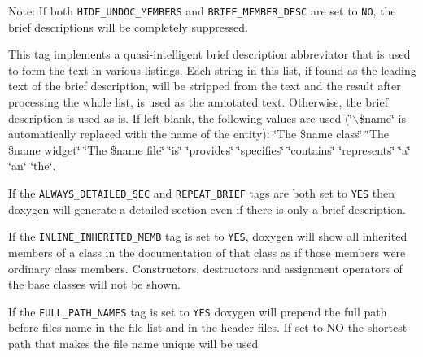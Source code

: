 \begin{description}
\begin{Desc}
\item[Note: ]If both {\tt HIDE\_\-UNDOC\_\-MEMBERS} and {\tt BRIEF\_\-MEMBER\_\-DESC} are set to {\tt NO}, the brief descriptions will be completely suppressed.\end{Desc}
\label{config_cfg_abbreviate_brief}
\hypertarget{config_cfg_abbreviate_brief}{}
 \item[{\tt ABBREVIATE\_\-BRIEF} ] This tag implements a quasi-intelligent brief description abbreviator that is used to form the text in various listings. Each string in this list, if found as the leading text of the brief description, will be stripped from the text and the result after processing the whole list, is used as the annotated text. Otherwise, the brief description is used as-is. If left blank, the following values are used (\char`\"{}$\backslash$\$name\char`\"{} is automatically replaced with the name of the entity): \char`\"{}The \$name class\char`\"{} \char`\"{}The \$name widget\char`\"{} \char`\"{}The \$name file\char`\"{} \char`\"{}is\char`\"{} \char`\"{}provides\char`\"{} \char`\"{}specifies\char`\"{} \char`\"{}contains\char`\"{} \char`\"{}represents\char`\"{} \char`\"{}a\char`\"{} \char`\"{}an\char`\"{} \char`\"{}the\char`\"{}.

\label{config_cfg_always_detailed_sec}
\hypertarget{config_cfg_always_detailed_sec}{}
 \item[{\tt ALWAYS\_\-DETAILED\_\-SEC} ] If the {\tt ALWAYS\_\-DETAILED\_\-SEC} and {\tt REPEAT\_\-BRIEF} tags are both set to {\tt YES} then doxygen will generate a detailed section even if there is only a brief description.

\label{config_cfg_inline_inherited_memb}
\hypertarget{config_cfg_inline_inherited_memb}{}
 \item[{\tt INLINE\_\-INHERITED\_\-MEMB} ] If the {\tt INLINE\_\-INHERITED\_\-MEMB} tag is set to {\tt YES}, doxygen will show all inherited members of a class in the documentation of that class as if those members were ordinary class members. Constructors, destructors and assignment operators of the base classes will not be shown.

\label{config_cfg_full_path_names}
\hypertarget{config_cfg_full_path_names}{}
 \item[{\tt FULL\_\-PATH\_\-NAMES} ] If the {\tt FULL\_\-PATH\_\-NAMES} tag is set to {\tt YES} doxygen will prepend the full path before files name in the file list and in the header files. If set to NO the shortest path that makes the file name unique will be used


\end{description}
